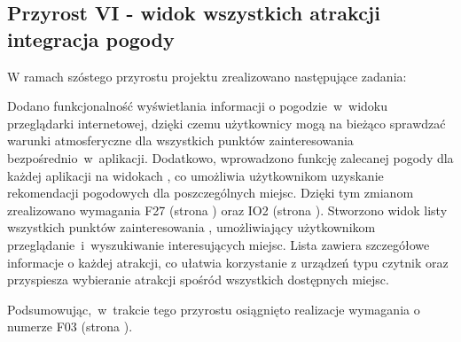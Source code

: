 
    \subsection{Przyrost VI - widok wszystkich atrakcji integracja pogody}
    \label{sec:przyrost6}

    W ramach szóstego przyrostu projektu zrealizowano następujące zadania:
  
    \indent Dodano funkcjonalność wyświetlania informacji o pogodzie~w~widoku 
    przeglądarki internetowej, dzięki czemu użytkownicy mogą na bieżąco sprawdzać warunki atmosferyczne dla wszystkich punktów zainteresowania bezpośrednio~w~aplikacji. 
    Dodatkowo, wprowadzono funkcję zalecanej pogody dla każdej aplikacji na widokach , 
    co umożliwia użytkownikom uzyskanie rekomendacji pogodowych dla poszczególnych miejsc. Dzięki tym zmianom zrealizowano wymagania F27 (strona \pageref{tab:requirements:func27}) oraz IO2 (strona \pageref{tab:requirements:env2}). \newline
    \indent Stworzono widok listy wszystkich punktów zainteresowania , umożliwiający użytkownikom 
    przeglądanie~i~wyszukiwanie interesujących miejsc. Lista zawiera szczegółowe informacje 
    o każdej atrakcji, co ułatwia korzystanie z urządzeń 
    typu czytnik oraz przyspiesza wybieranie atrakcji spośród wszystkich dostępnych miejsc. 
    
    Podsumowując,~w~trakcie tego przyrostu osiągnięto realizacje wymagania o numerze F03 (strona \pageref{tab:requirements:func3}).


